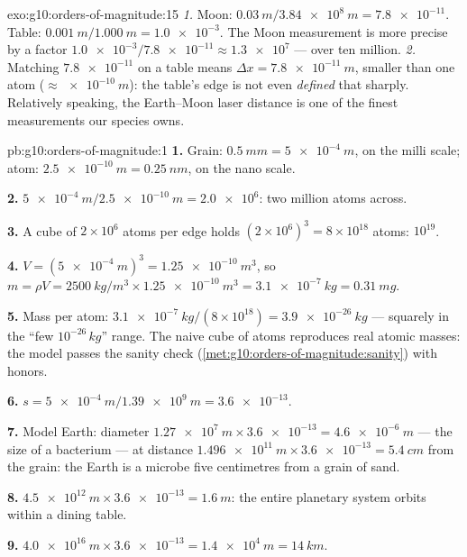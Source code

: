 \begin{solution}{exo:g10:orders-of-magnitude:15}
\emph{1.} Moon: $\qty{0.03}{m}/\qty{3.84e8}{m} = \num{7.8e-11}$.
Table: $\qty{0.001}{m}/\qty{1.000}{m} = \num{1.0e-3}$. The Moon
measurement is more precise by a factor
$\num{1.0e-3}/\num{7.8e-11} \approx \num{1.3e7}$ --- over ten million.
\emph{2.} Matching $\num{7.8e-11}$ on a  table means
$\Delta x = \qty{7.8e-11}{m}$, smaller than one atom
($\approx \qty{e-10}{m}$): the table's edge is not even
\emph{defined} that sharply. Relatively speaking, the Earth--Moon
laser distance is one of the finest measurements our species owns.
\end{solution}

\begin{solution}{pb:g10:orders-of-magnitude:1}
\textbf{1.} Grain: $\qty{0.5}{mm} = \qty{5e-4}{m}$, on the milli
scale; atom: $\qty{2.5e-10}{m} = \qty{0.25}{nm}$, on the nano scale.

\textbf{2.} $\qty{5e-4}{m}/\qty{2.5e-10}{m} = \num{2.0e6}$: two
million atoms across.

\textbf{3.} A cube of $2 \times 10^{6}$ atoms per edge holds
$(2\times10^{6})^{3} = 8 \times 10^{18}$ atoms: 
$10^{19}$.

\textbf{4.} $V = (\qty{5e-4}{m})^{3} = \qty{1.25e-10}{m^3}$, so
$m = \rho V = \qty{2500}{kg/m^3} \times \qty{1.25e-10}{m^3}
= \qty{3.1e-7}{kg} = \qty{0.31}{mg}$.

\textbf{5.} Mass per atom:
$\qty{3.1e-7}{kg}/(8\times10^{18}) = \qty{3.9e-26}{kg}$ --- squarely
in the ``few $10^{-26}\,\unit{kg}$'' range. The naive cube of atoms
reproduces real atomic masses: the model passes the sanity check
(\cref{met:g10:orders-of-magnitude:sanity}) with honors.

\textbf{6.} $s = \qty{5e-4}{m}/\qty{1.39e9}{m} = \num{3.6e-13}$.

\textbf{7.} Model Earth: diameter
$\qty{1.27e7}{m} \times \num{3.6e-13} = \qty{4.6e-6}{m}$ --- the size
of a bacterium --- at distance
$\qty{1.496e11}{m} \times \num{3.6e-13} = \qty{5.4}{cm}$ from the
grain: the Earth is a microbe five centimetres from a grain of sand.

\textbf{8.} $\qty{4.5e12}{m} \times \num{3.6e-13} = \qty{1.6}{m}$: the
entire planetary system orbits within a dining table.

\textbf{9.} $\qty{4.0e16}{m} \times \num{3.6e-13} = \qty{1.4e4}{m}
= \qty{14}{km}$.


\end{solution}
